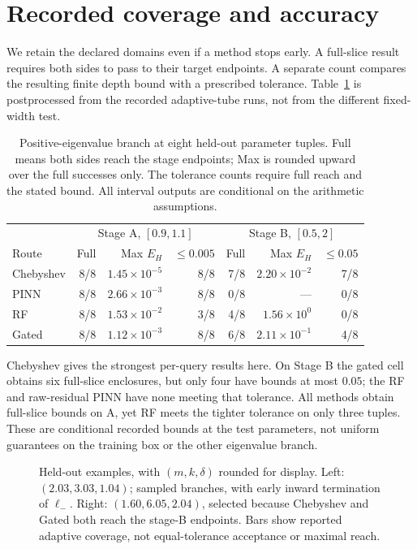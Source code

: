 \documentclass[12pt,a4paper,oneside]{report}
\numberwithin{equation}{chapter}
\theoremstyle{definition}
\theoremstyle{remark}\newtheorem{remark}[theorem]{Remark}
\newif\ifreviewmarks
\DeclareRobustCommand{\review}[1]{{\ifreviewmarks\color{authorblue}\fi #1}}
\renewcommand{\arraystretch}{1.3}
\begin{document}
\section{Recorded coverage and accuracy}\label{sec:results}
\review{We retain the declared domains even if a method stops early. A full-slice result requires both sides to pass to their target endpoints. A separate count compares the resulting finite depth bound with a prescribed tolerance. Table~\ref{tab:param-results} is postprocessed from the recorded adaptive-tube runs, not from the different fixed-width test.}
\begin{table}[!ht]\centering\small
\setlength{\tabcolsep}{2.6pt}
\renewcommand{\arraystretch}{1.16}
\begin{tabular}{@{}lrrr|rrr@{}}\toprule
&\multicolumn{3}{c|}{Stage A, $[0.9,1.1]$}&\multicolumn{3}{c}{Stage B, $[0.5,2]$}\\
Route & Full & Max $E_H$ & $\le0.005$ & Full & Max $E_H$ & $\le0.05$\\\midrule
Chebyshev & 8/8 & $1.45\times10^{-5}$ & 8/8 & 7/8 & $2.20\times10^{-2}$ & 7/8 \\
PINN & 8/8 & $2.66\times10^{-3}$ & 8/8 & 0/8 & --- & 0/8 \\
RF & 8/8 & $1.53\times10^{-2}$ & 3/8 & 4/8 & $1.56\times10^{0}$ & 0/8 \\
Gated & 8/8 & $1.12\times10^{-3}$ & 8/8 & 6/8 & $2.11\times10^{-1}$ & 4/8 \\
\bottomrule
\end{tabular}
\caption[Held-out depth bounds and tolerance counts]{\review{Positive-eigenvalue branch at eight held-out parameter tuples. Full means both sides reach the stage endpoints; Max is rounded upward over the full successes only. The tolerance counts require full reach and the stated bound. All interval outputs are conditional on the arithmetic assumptions.}}
\label{tab:param-results}
\end{table}
\review{Chebyshev gives the strongest per-query results here. On Stage B the gated cell obtains six full-slice enclosures, but only four have bounds at most $0.05$; the RF and raw-residual PINN have none meeting that tolerance. All methods obtain full-slice bounds on A, yet RF meets the tighter tolerance on only three tuples. These are conditional recorded bounds at the test parameters, not uniform guarantees on the training box or the other eigenvalue branch.}
\begin{figure}[!ht]\centering

\caption[Sampled branches and reported coverage]{\review{Held-out examples, with $(m,k,\delta)$ rounded for display. Left: $(2.03,3.03,1.04)$; sampled branches, with early inward termination of $\ell_-$. Right: $(1.60,6.05,2.04)$, selected because Chebyshev and Gated both reach the stage-B endpoints. Bars show reported adaptive coverage, not equal-tolerance acceptance or maximal reach.}}
\label{fig:param-branches}
\end{figure}
\end{document}

